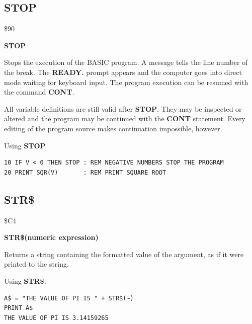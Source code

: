 
\newpage
\subsection{STOP}
\begin{description}[leftmargin=2cm,style=nextline]
\item [Token:] \$90
\item [Format:] {\bf STOP}
\item [Usage:] Stops the execution
               of the BASIC program.
               A message tells the line number of the break.
               The {\bf READY.} prompt
               appears and the computer goes into direct mode
               waiting for keyboard input.
               The program execution can be resumed with the command
               {\bf CONT}.

\item [Remarks:]
               All variable definitions are still valid after {\bf STOP}.
               They may be inspected or altered and the
               program may be continued with the {\bf CONT}
               statement. Every editing of the program source
               makes continuation impossible, however.

\item [Example:] Using {\bf STOP}
\begin{tcolorbox}[colback=black,coltext=white]
\verbatimfont{\codefont}
\begin{verbatim}
10 IF V < 0 THEN STOP : REM NEGATIVE NUMBERS STOP THE PROGRAM
20 PRINT SQR(V)       : REM PRINT SQUARE ROOT
\end{verbatim}
\end{tcolorbox}
\end{description}


\newpage
\subsection{STR\$}
\begin{description}[leftmargin=2cm,style=nextline]
\item [Token:] \$C4
\item [Format:] {\bf STR\$(numeric expression)}
\item [Usage:] Returns a string
               containing the formatted value of the argument,
               as if it were printed to the string.

\item [Example:] Using {\bf STR\$}:
\begin{tcolorbox}[colback=black,coltext=white]
\verbatimfont{\codefont}
\begin{verbatim}
A$ = "THE VALUE OF PI IS " + STR$(~)
PRINT A$
THE VALUE OF PI IS 3.14159265
\end{verbatim}
\end{tcolorbox}
\end{description}

